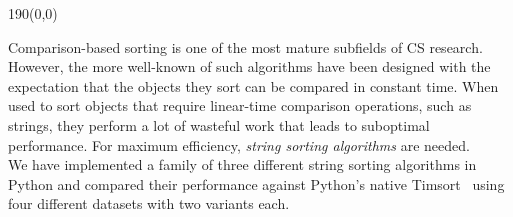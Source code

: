 \begin{textblock}{190}(0,0)
\begin{multicols}{2}
\sffamily
\small 
Comparison-based sorting is one of the most mature subfields of CS research.
However, the more well-known of such algorithms have been designed with the
expectation that the objects they sort can be compared in constant time.
When used to sort objects that require linear-time comparison operations,
such as strings, they perform a lot of wasteful work that leads to suboptimal
performance. For maximum efficiency, \emph{string sorting algorithms} are
needed.\\
We have implemented a family of three different string sorting algorithms in
Python and compared their performance against Python's native Timsort~\cite{p2002} using
four different datasets with two variants each.
\end{multicols}
\end{textblock}

